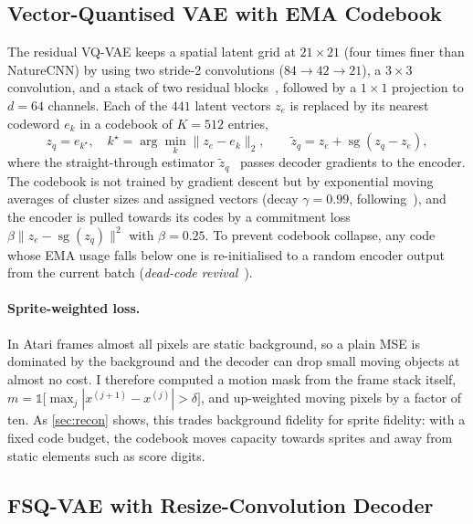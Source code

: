 \documentclass[runningheads]{llncs}
\newcommand{\sg}{\operatorname{sg}}
\begin{document}
\subsection{Vector-Quantised VAE with EMA Codebook}
\label{sec:vqvae}

The residual VQ-VAE keeps a spatial latent grid at $21\times21$ (four times finer than
NatureCNN) by using two stride-2 convolutions ($84\to42\to21$), a $3\times3$ convolution,
and a stack of two residual blocks~\cite{he2016resnet}, followed by a $1\times1$
projection to $d=64$ channels. Each of the $441$ latent vectors $z_e$ is replaced by its
nearest codeword $e_k$ in a codebook of $K=512$ entries,
\begin{equation}
  z_q = e_{k^\star},\quad k^\star=\arg\min_k \|z_e-e_k\|_2,\qquad
  \tilde z_q = z_e + \sg(z_q - z_e),
\end{equation}
where the straight-through estimator $\tilde z_q$~\cite{bengio2013ste} passes decoder
gradients to the encoder. The codebook is not trained by gradient descent but by
exponential moving averages of cluster sizes and assigned vectors (decay $\gamma=0.99$,
following~\cite{vandenoord2017vqvae,razavi2019vqvae2}), and the encoder is pulled towards
its codes by a commitment loss $\beta\|z_e-\sg(z_q)\|^2$ with $\beta=0.25$. To prevent
codebook collapse, any code whose EMA usage falls below one is re-initialised to a
random encoder output from the current batch (\emph{dead-code
revival}~\cite{dhariwal2020jukebox}).

\paragraph{Sprite-weighted loss.}
In Atari frames almost all pixels are static background, so a plain MSE is dominated by
the background and the decoder can drop small moving objects at almost no cost. I
therefore computed a motion mask from the frame stack itself,
$m=\mathbb{1}\big[\max_{j}|x^{(j+1)}-x^{(j)}|>\delta\big]$, and up-weighted moving
pixels by a factor of ten. As \cref{sec:recon} shows, this trades background fidelity
for sprite fidelity: with a fixed code budget, the codebook moves capacity towards
sprites and away from static elements such as score digits.

\subsection{FSQ-VAE with Resize-Convolution Decoder}
\label{sec:fsq}
\end{document}
